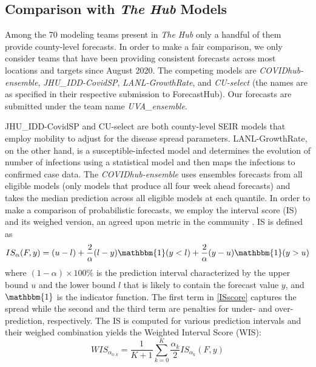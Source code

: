 \documentclass[sigconf]{acmart}
\newcommand{\hub}{\emph{The Hub}}
\begin{document}
% 
\subsection{Comparison with \hub{} Models}
Among the 70 modeling teams present in \hub{} only a handful of them provide county-level forecasts. In order to make a fair comparison, we only consider teams that have been providing consistent forecasts across most locations and targets since August 2020. The competing models are \emph{COVIDhub-ensemble},  \emph{JHU\_IDD-CovidSP}, \emph{LANL-GrowthRate}, and \emph{CU-select} (the names are as specified in their respective submission to ForecastHub). Our forecasts are submitted under the team name \emph{UVA\_ensemble}.   

 JHU\_IDD-CovidSP and CU-select are both county-level SEIR models that employ mobility to adjust for the disease spread parameters. LANL-GrowthRate, on the other hand, is a susceptible-infected model and determines the evolution of number of infections using a statistical model and then maps the infections to confirmed case data. The \emph{COVIDhub-ensemble} uses ensembles forecasts from all eligible models (only models that produce all four week ahead forecasts) and takes the median prediction across all eligible models at each quantile. In order to make a comparison of probabilistic forecasts, we employ the interval score (IS) and its weighed version, an agreed upon metric in the community \cite{bracher2020evaluating}. IS is defined as
\begin{equation}
    IS_{\alpha}(F,y)=(u-l) + \frac{2}{\alpha} (l-y) \mathbbm{1}(y<l) + \frac{2}{\alpha} (y-u) \mathbbm{1}(y>u)
    \label{ISscore}
\end{equation}
where $(1-\alpha)\times 100\%$ is the prediction interval characterized by the upper bound $u$ and the lower bound $l$ that is likely to contain the forecast value $y$, and $\mathbbm{1}$ is the indicator function. The first term in \eqref{ISscore} captures the spread while the second and the third term are penalties for under- and over-prediction, respectively. The IS is computed for various prediction intervals and their weighed combination yields the Weighted Interval Score (WIS):
\begin{equation}
    WIS_{\alpha_{0:k}} = \frac{1}{K+1} \sum_{k=0}^{K} \frac{\alpha_k}{2} IS_{\alpha_k}(F,y)
\end{equation}
\end{document}
